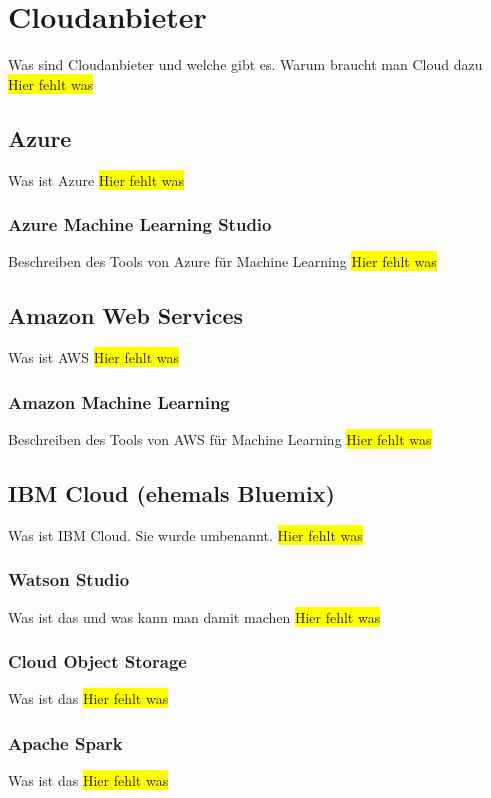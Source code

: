 \section{Cloudanbieter}
Was sind Cloudanbieter und welche gibt es. Warum braucht man Cloud dazu
\colorbox{yellow}{Hier fehlt was}

\subsection{Azure}
Was ist Azure
\colorbox{yellow}{Hier fehlt was}

\subsubsection{Azure Machine Learning Studio}
Beschreiben des Tools von Azure für Machine Learning
\colorbox{yellow}{Hier fehlt was}

\subsection{Amazon Web Services}
Was ist AWS
\colorbox{yellow}{Hier fehlt was}

\subsubsection{Amazon Machine Learning}
Beschreiben des Tools von AWS für Machine Learning
\colorbox{yellow}{Hier fehlt was}

\subsection{IBM Cloud (ehemals Bluemix)}
Was ist IBM Cloud. Sie wurde umbenannt.
\colorbox{yellow}{Hier fehlt was}

\subsubsection{Watson Studio}
Was ist das und was kann man damit machen
\colorbox{yellow}{Hier fehlt was}

\subsubsection{Cloud Object Storage}
Was ist das
\colorbox{yellow}{Hier fehlt was}

\subsubsection{Apache Spark}
Was ist das
\colorbox{yellow}{Hier fehlt was}


